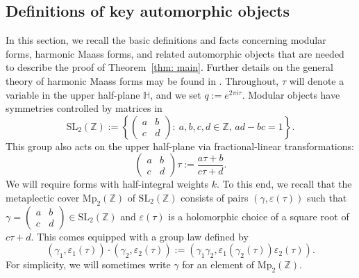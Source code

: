 \documentclass[11pt,reqno]{amsart}
\newcommand{\Z}{\mathbb{Z}}
\renewcommand{\=}{\;=\;}
\theoremstyle{myremark}
\begin{document}
\subsection{Definitions of key automorphic objects}
In this section, we recall the basic definitions and facts concerning modular forms, harmonic Maass forms, and related automorphic objects that are needed to describe the proof of Theorem~\ref{thm: main}.
Further details on the general theory of harmonic Maass forms may be found in \cite{HMFBook}.
Throughout, $\tau$ will denote a variable in the upper half-plane $\mathbb H$, and we set $q:=e^{2\pi i\tau}$. 
Modular objects have symmetries controlled by matrices in 
\[
\mathrm{SL}_2(\Z):=\left\{\left(\begin{smallmatrix}a& b\\ c & d\end{smallmatrix}\right) : \ a,b,c,d\in\Z, \, ad-bc=1\right\}.
\]
This group also acts on the upper half-plane via fractional-linear transformations:
\[
\left(\begin{smallmatrix}a& b\\ c & d\end{smallmatrix}\right)\tau:=\frac{a\tau+b}{c\tau+d}.
\]
We will require forms with half-integral weights $k$. 
To this end, we recall that the metaplectic cover $\mathrm{Mp}_2(\Z)$ of $\mathrm{SL}_2(\Z)$ consists of pairs $(\gamma,\varepsilon(\tau))$ such that $\gamma=\left(\begin{smallmatrix}a&b\\ c&d\end{smallmatrix}\right)\in\mathrm{SL}_2(\Z)$ and $\varepsilon(\tau)$ is a holomorphic choice of a square root of $c\tau+d$. 
This comes equipped with a group law defined by 
\[
(\gamma_1,\varepsilon_1(\tau))\cdot(\gamma_2,\varepsilon_2(\tau)):=(\gamma_1\gamma_2,\varepsilon_1(\gamma_2(\tau))\varepsilon_2(\tau)).
\]
For simplicity, we will sometimes write $\gamma$ for an element of $\mathrm{Mp}_2(\Z)$.
\end{document}
